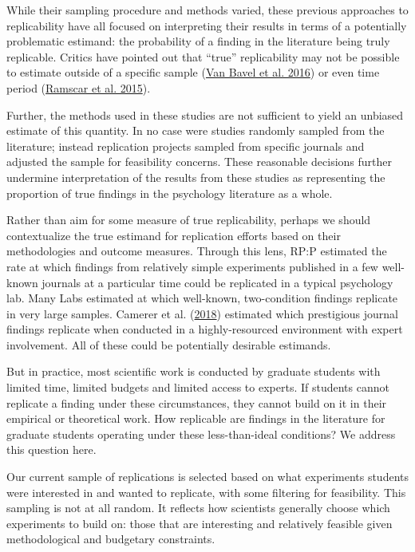 \documentclass[
  english,
  a4paper,
]{article}
\begin{document}
While their sampling procedure and methods varied, these previous approaches to replicability have all focused on interpreting their results in terms of a potentially problematic estimand: the probability of a finding in the literature being truly replicable. Critics have pointed out that ``true'' replicability may not be possible to estimate outside of a specific sample (\protect\hyperlink{ref-vanbavel2016}{Van Bavel et al. 2016}) or even time period (\protect\hyperlink{ref-ramscar2015}{Ramscar et al. 2015}).

Further, the methods used in these studies are not sufficient to yield an unbiased estimate of this quantity. In no case were studies randomly sampled from the literature; instead replication projects sampled from specific journals and adjusted the sample for feasibility concerns. These reasonable decisions further undermine interpretation of the results from these studies as representing the proportion of true findings in the psychology literature as a whole.

Rather than aim for some measure of true replicability, perhaps we should contextualize the true estimand for replication efforts based on their methodologies and outcome measures. Through this lens, RP:P estimated the rate at which findings from relatively simple experiments published in a few well-known journals at a particular time could be replicated in a typical psychology lab. Many Labs estimated at which well-known, two-condition findings replicate in very large samples. Camerer et al. (\protect\hyperlink{ref-camerer2018}{2018}) estimated which prestigious journal findings replicate when conducted in a highly-resourced environment with expert involvement. All of these could be potentially desirable estimands.

But in practice, most scientific work is conducted by graduate students with limited time, limited budgets and limited access to experts. If students cannot replicate a finding under these circumstances, they cannot build on it in their empirical or theoretical work. How replicable are findings in the literature for graduate students operating under these less-than-ideal conditions? We address this question here.

Our current sample of replications is selected based on what experiments students were interested in and wanted to replicate, with some filtering for feasibility. This sampling is not at all random. It reflects how scientists generally choose which experiments to build on: those that are interesting and relatively feasible given methodological and budgetary constraints.
\end{document}
